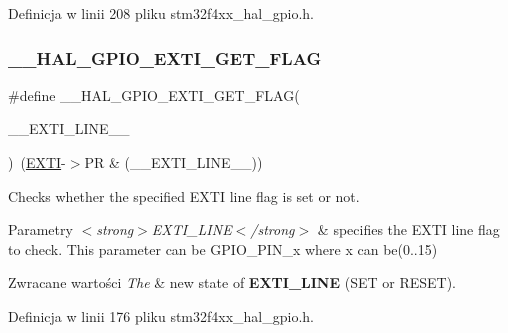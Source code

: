 Definicja w linii 208 pliku stm32f4xx\+\_\+hal\+\_\+gpio.\+h.

\mbox{\label{group___g_p_i_o___exported___macros_gaae18fc8d92ffa4df2172c78869e712fc}} 
\subsubsection{\texorpdfstring{\+\_\+\+\_\+\+H\+A\+L\+\_\+\+G\+P\+I\+O\+\_\+\+E\+X\+T\+I\+\_\+\+G\+E\+T\+\_\+\+F\+L\+AG}{\_\_HAL\_GPIO\_EXTI\_GET\_FLAG}}
{\footnotesize\ttfamily \#define \+\_\+\+\_\+\+H\+A\+L\+\_\+\+G\+P\+I\+O\+\_\+\+E\+X\+T\+I\+\_\+\+G\+E\+T\+\_\+\+F\+L\+AG(\begin{DoxyParamCaption}\item[{}]{\+\_\+\+\_\+\+E\+X\+T\+I\+\_\+\+L\+I\+N\+E\+\_\+\+\_\+ }\end{DoxyParamCaption})~(\hyperlink{group___peripheral__declaration_ga9189e770cd9b63dadd36683eb9843cac}{E\+X\+TI}-\/$>$PR \& (\+\_\+\+\_\+\+E\+X\+T\+I\+\_\+\+L\+I\+N\+E\+\_\+\+\_\+))}



Checks whether the specified E\+X\+TI line flag is set or not. 


\begin{DoxyParams}{Parametry}
{\em $<$strong$>$\+E\+X\+T\+I\+\_\+\+L\+I\+N\+E$<$/strong$>$} & specifies the E\+X\+TI line flag to check. This parameter can be G\+P\+I\+O\+\_\+\+P\+I\+N\+\_\+x where x can be(0..15) \\
\hline
\end{DoxyParams}

\begin{DoxyRetVals}{Zwracane wartości}
{\em The} & new state of {\bfseries E\+X\+T\+I\+\_\+\+L\+I\+NE} (S\+ET or R\+E\+S\+ET). \\
\hline
\end{DoxyRetVals}


Definicja w linii 176 pliku stm32f4xx\+\_\+hal\+\_\+gpio.\+h.

